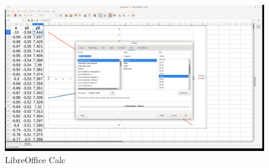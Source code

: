 \begin{figure}[h!]		
	\centering
   	\includegraphics[width=8.0in]{pictures/picture_022.png}
  	\caption{LibreOffice Calc}
   	\label{fig:LibreOfficeCalc022}
\end{figure}